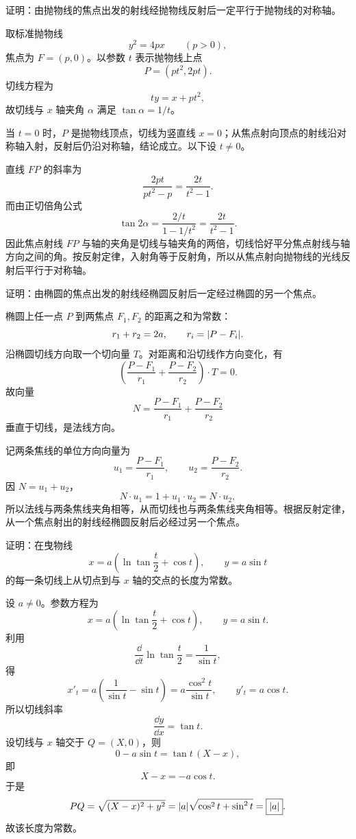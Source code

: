 \begin{xreferenceproblem}[11]
证明：由抛物线的焦点出发的射线经抛物线反射后一定平行于抛物线的对称轴。
\end{xreferenceproblem}
\begin{xsolution}
取标准抛物线
\[
  y^2=4px\qquad(p>0),
\]
焦点为 $F=(p,0)$。以参数 $t$ 表示抛物线上点
\[
  P=(pt^2,2pt).
\]
切线方程为
\[
  ty=x+pt^2,
\]
故切线与 $x$ 轴夹角 $\alpha$ 满足 $\tan\alpha=1/t$。

当 $t=0$ 时，$P$ 是抛物线顶点，切线为竖直线 $x=0$；从焦点射向顶点的射线沿对称轴入射，反射后仍沿对称轴，结论成立。以下设 $t\ne0$。

直线 $FP$ 的斜率为
\[
  \frac{2pt}{pt^2-p}=\frac{2t}{t^2-1}.
\]
而由正切倍角公式
\[
  \tan2\alpha=\frac{2/t}{1-1/t^2}=\frac{2t}{t^2-1}.
\]
因此焦点射线 $FP$ 与轴的夹角是切线与轴夹角的两倍，切线恰好平分焦点射线与轴方向之间的角。按反射定律，入射角等于反射角，所以从焦点射向抛物线的光线反射后平行于对称轴。
\end{xsolution}


\begin{xreferenceproblem}[12]
证明：由椭圆的焦点出发的射线经椭圆反射后一定经过椭圆的另一个焦点。
\end{xreferenceproblem}
\begin{xsolution}
椭圆上任一点 $P$ 到两焦点 $F_1,F_2$ 的距离之和为常数：
\[
  r_1+r_2=2a,
  \qquad r_i=\lvert P-F_i\rvert.
\]
沿椭圆切线方向取一个切向量 $T$。对距离和沿切线作方向变化，有
\[
  \left(\frac{P-F_1}{r_1}+\frac{P-F_2}{r_2}\right)\cdot T=0.
\]
故向量
\[
  N=\frac{P-F_1}{r_1}+\frac{P-F_2}{r_2}
\]
垂直于切线，是法线方向。

记两条焦线的单位方向向量为
\[
  u_1=\frac{P-F_1}{r_1},\qquad u_2=\frac{P-F_2}{r_2}.
\]
因 $N=u_1+u_2$，
\[
  N\cdot u_1=1+u_1\cdot u_2=N\cdot u_2,
\]
所以法线与两条焦线夹角相等，从而切线也与两条焦线夹角相等。根据反射定律，从一个焦点射出的射线经椭圆反射后必经过另一个焦点。
\end{xsolution}


\begin{xreferenceproblem}[13]
证明：在曳物线
  \[
    x=a\left(\ln\tan\frac t2+\cos t\right),\qquad y=a\sin t
  \]
  的每一条切线上从切点到与 $x$ 轴的交点的长度为常数。
\end{xreferenceproblem}
\begin{xsolution}
设 $a\ne0$。参数方程为
\[
  x=a\left(\ln\tan\frac t2+\cos t\right),
  \qquad y=a\sin t.
\]
利用
\[
  \frac{\dd}{\dd t}\ln\tan\frac t2=\frac1{\sin t},
\]
得
\[
  x'_t=a\left(\frac1{\sin t}-\sin t\right)
  =a\frac{\cos^2t}{\sin t},
  \qquad
  y'_t=a\cos t.
\]
所以切线斜率
\[
  \frac{\dd y}{\dd x}=\tan t.
\]
设切线与 $x$ 轴交于 $Q=(X,0)$，则
\[
  0-a\sin t=\tan t\,(X-x),
\]
即
\[
  X-x=-a\cos t.
\]
于是
\[
  PQ=\sqrt{(X-x)^2+y^2}
  =\lvert a\rvert\sqrt{\cos^2t+\sin^2t}
  =\boxed{\lvert a\rvert}.
\]
故该长度为常数。
\end{xsolution}


